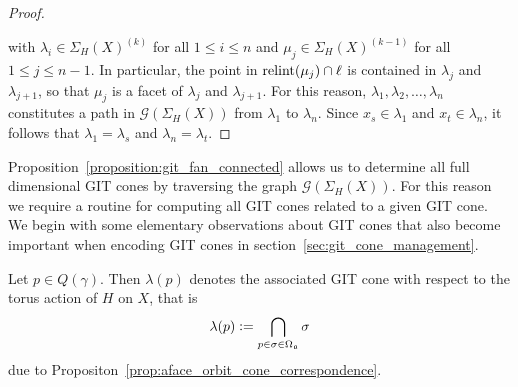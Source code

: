 \begin{proof}
\begin{center}
	\end{center}
	
	with $\lambda_i\in\Sigma_H(X)^{(k)}$ for all $1\leq i \leq n$ and $\mu_j\in\Sigma_H(X)^{(k-1)}$ for all $1\leq j \leq n-1$. In particular, the point in $\text{relint}(\mu_j)\cap \ell$ is contained in $\lambda_j$ and $\lambda_{j+1}$, so that $\mu_j$ is a facet of $\lambda_j$ and $\lambda_{j+1}$. For this reason, $\lambda_1,\lambda_2,\dots,\lambda_n$ constitutes a path in $\mathcal{G}(\Sigma_H(X))$ from $\lambda_1$ to $\lambda_n$. Since $x_s\in\lambda_1$ and $x_t\in\lambda_n$, it follows that $\lambda_1 = \lambda_s$ and $\lambda_n = \lambda_t$.
\end{proof}

Proposition~\ref{proposition:git_fan_connected} allows us to determine all full dimensional GIT cones by traversing the graph $\mathcal{G}(\Sigma_H(X))$. For this reason we require a routine for computing all GIT cones related to a given GIT cone. We begin with some elementary observations about GIT cones that also become important when encoding GIT cones in section~\ref{sec:git_cone_management}.

\begin{notation}
	Let $p\in Q(\gamma)$. Then $\lambda(p)$ denotes the associated GIT cone with respect to the torus action of $H$ on $X$, that is
	$$\lambda(p) \mathrel{\mathop:}= \bigcap_{p\in\sigma\in\Omega_{\mathfrak{a}}} \sigma$$
	due to Propositon~\ref{prop:aface_orbit_cone_correspondence}.
\end{notation}

